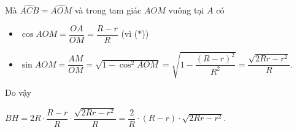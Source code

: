 \begin{bt}[3,0 điểm]
{\begin{enumerate}[1.]
                  Mà $\widehat{ACB}=\widehat{AOM}$ và trong tam giác $AOM$ vuông tại $A$ có 
                  \begin{itemize}
                  \item $\cos AOM = \dfrac{OA}{OM}= \dfrac{R-r}{R}$ (vì ($*$))\\
                  \item $\sin AOM = \dfrac{AM}{OM}= \sqrt{1-\cos ^2 AOM}=\sqrt{1-\dfrac{(R-r)^2}{R^2}}=\dfrac{\sqrt{2Rr-r^2}}{R}$.
                  \end{itemize}
                  Do vậy
                  \begin{center}
                    $BH = 2R \cdot \dfrac{R-r}{R} \cdot \dfrac{\sqrt{2Rr-r^2}}{R} = \dfrac{2}{R} \cdot (R-r) \cdot \sqrt{2Rr-r^2}$.
                  \end{center}
        \end{enumerate}
    }
\end{bt}